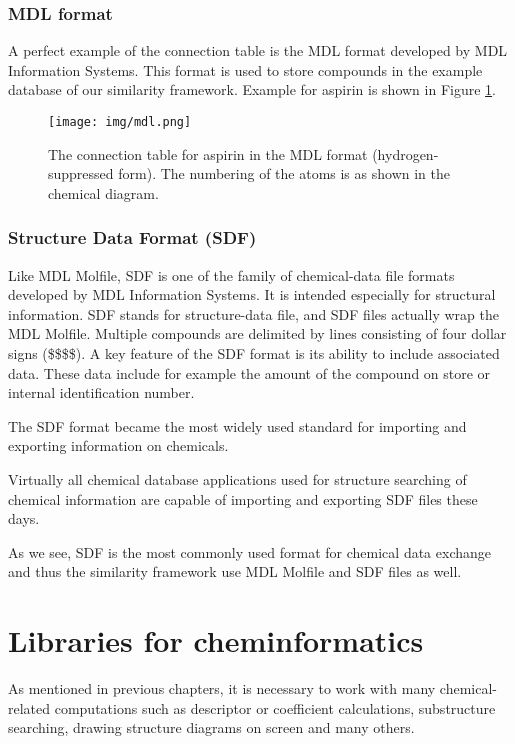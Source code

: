 \documentclass[thesis=M,english]{FITthesis}[2012/10/20]
\begin{document}
\subsubsection{MDL format}
\label{mdlFormatRef}

A perfect example of the connection table is the MDL format developed by MDL Information Systems. This format is used to store compounds in the example database of our similarity framework. Example for aspirin is shown in Figure \ref{fig:mdl}.

\begin{figure}
  \centering
  \texttt{[image: img/mdl.png]}
  \caption{The connection table for aspirin in the MDL format (hydrogen-suppressed form).
The numbering of the atoms is as shown in the chemical diagram.}
  \label{fig:mdl}
\end{figure}

\subsubsection{Structure Data Format (SDF)}
Like MDL Molfile, SDF is one of the family of chemical-data file formats developed by MDL Information Systems. It is intended especially for structural information. SDF stands for structure-data file, and SDF files actually wrap the MDL Molfile. Multiple compounds are delimited by lines consisting of four dollar signs (\$\$\$\$). A key feature of the SDF format is its ability to include associated data. These data include for example the amount of the compound on store or internal identification number.

The SDF format became the most widely used standard for importing and exporting information on chemicals.\cite{sdf}  

Virtually all chemical database applications used for structure searching of chemical information are capable of importing and exporting SDF files these days.\cite{sdf2}

As we see, SDF is the most commonly used format for chemical data exchange and thus the similarity framework use MDL Molfile and SDF files as well.


\section{Libraries for cheminformatics}
\label{chemLibrariesRef}
As mentioned in previous chapters, it is necessary to work with many chemical-related computations such as descriptor or coefficient calculations, substructure searching, drawing structure diagrams on screen and many others.
\end{document}
